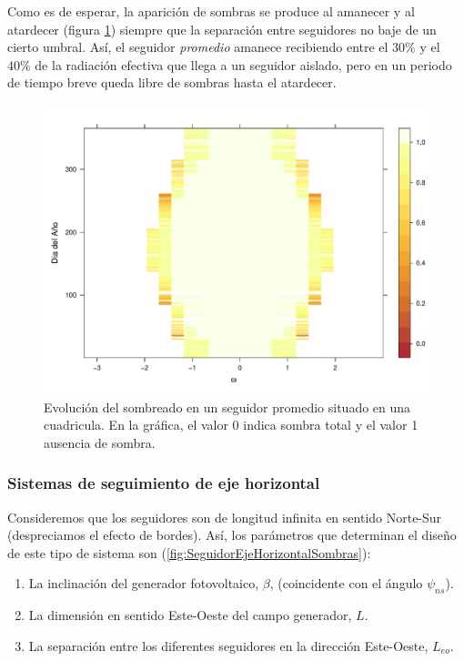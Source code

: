 Como es de esperar, la aparición de sombras se produce al amanecer
y al atardecer (figura \ref{fig:CuadriculaFija}) siempre que la separación
entre seguidores no baje de un cierto umbral. Así, el seguidor \emph{promedio}
amanece recibiendo entre el $30\%$ y el $40\%$ de la radiación efectiva
que llega a un seguidor aislado, pero en un periodo de tiempo breve
queda libre de sombras hasta el atardecer. 

%
\begin{figure}
\begin{centering}
\includegraphics[scale=0.6]{../figs/SombrasDiaAno_Lns30Leo40}
\end{centering}

\caption[Evolución del sombreado en un seguidor
promedio]{\label{fig:CuadriculaFija}
Evolución del sombreado en un seguidor
promedio situado en una cuadricula. 
En la gráfica, el valor 0 indica
sombra total y el valor 1 ausencia de sombra.}

\end{figure}

\subsubsection{Sistemas de seguimiento de eje horizontal}

Consideremos que los seguidores son de longitud infinita en sentido
Norte-Sur (despreciamos el efecto de bordes). Así, los parámetros
que determinan el diseño de este tipo de sistema son (\ref{fig:SeguidorEjeHorizontalSombras}):

\begin{enumerate}
\item La inclinación del generador fotovoltaico, $\beta$, (coincidente
con el ángulo $\psi_{ns}$).
\item La dimensión en sentido Este-Oeste del campo generador, $L$.
\item La separación entre los diferentes seguidores en la dirección Este-Oeste,
$L_{eo}$. 
\end{enumerate}

